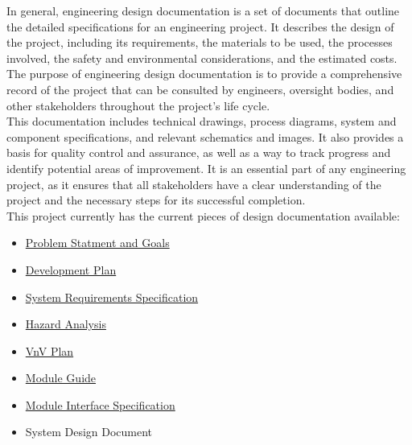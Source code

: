 \documentclass[12pt, titlepage]{article}
\begin{document}
In general, engineering design documentation is a set of documents that outline the detailed specifications for an engineering project. It describes the design of the project, including its requirements, the materials to be used, the processes involved, the safety and environmental considerations, and the estimated costs. The purpose of engineering design documentation is to provide a comprehensive record of the project that can be consulted by engineers, oversight bodies, and other stakeholders throughout the project’s life cycle.\\

This documentation includes technical drawings, process diagrams, system and component specifications, and relevant schematics and images. It also provides a basis for quality control and assurance, as well as a way to track progress and identify potential areas of improvement. It is an essential part of any engineering project, as it ensures that all stakeholders have a clear understanding of the project and the necessary steps for its successful completion.\\

This project currently has the current pieces of design documentation available:

\begin{itemize}
	\item \href{https://github.com/zakerl/Capstone_Project/blob/desDoc_Labeeb/docs/ProblemStatementAndGoals/Team1_ProblemStatement\%20\%26\%20Goals.pdf}{Problem Statment and Goals}\\
	\item \href{https://github.com/zakerl/Capstone_Project/blob/desDoc_Labeeb/docs/DevelopmentPlan/DevelopmentPlan.pdf}{Development Plan}\\
	\item \href{https://github.com/zakerl/Capstone_Project/blob/desDoc_Labeeb/docs/SRS/SRS.pdf}{System Requirements Specification}\\
	\item \href{https://github.com/zakerl/Capstone_Project/blob/desDoc_Labeeb/docs/HazardAnalysis/HazardAnalysis.pdf}{Hazard Analysis}\\
	\item \href{https://github.com/zakerl/Capstone_Project/blob/desDoc_Labeeb/docs/VnVPlan/VnVPlan.pdf}{VnV Plan}\\
	\item \href{https://github.com/zakerl/Capstone_Project/blob/desDoc_Labeeb/docs/Design/SoftArchitecture/MG.pdf}{Module Guide}\\
	\item \href{https://github.com/zakerl/Capstone_Project/blob/desDoc_Labeeb/docs/Design/SoftDetailedDes/MIS.pdf}{Module Interface Specification}\\
	\item System Design Document\\
\end{itemize}
\end{document}
